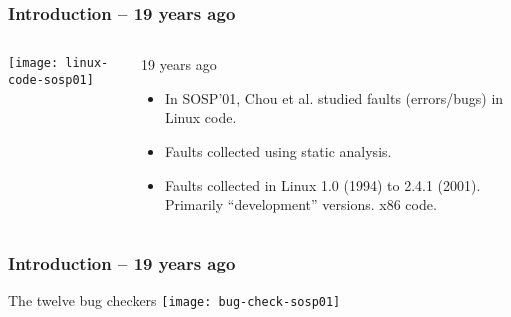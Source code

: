 \begin{frame}[plain]
	\frametitle{Introduction -- 19 years ago}
	
	
	
	\begin{columns}
		
		\begin{column}{.5\textwidth}
			
			\texttt{[image: linux-code-sosp01]}
			
		\end{column}
		
		\begin{column}{.5\textwidth}
			
			19 years ago
			
			\begin{itemize}
				\item   In SOSP'01, Chou et al. studied faults (errors/bugs) in Linux
				code.

				\item Faults collected using static analysis.
				
				
				\item Faults collected in Linux 1.0 (1994) to 2.4.1 (2001). Primarily “development” versions.  x86 code.
				
				
			\end{itemize}
			
		\end{column}
		
		
	\end{columns}
	
	
\end{frame}


\begin{frame}[plain]
	\frametitle{Introduction -- 19 years ago}
	\centering
    The twelve  bug checkers
	\texttt{[image: bug-check-sosp01]}
	
\end{frame}



